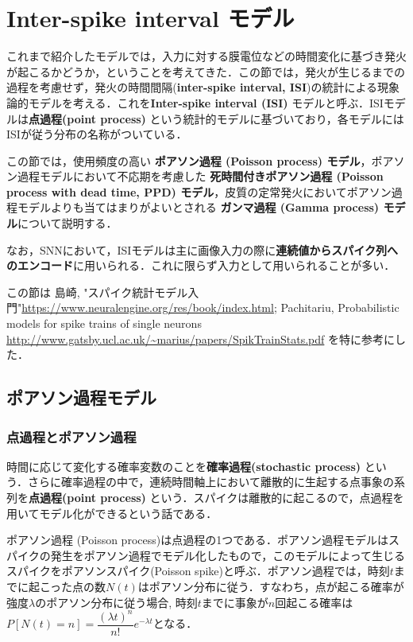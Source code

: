 \section{Inter-spike interval モデル}
これまで紹介したモデルでは，入力に対する膜電位などの時間変化に基づき発火が起こるかどうか，ということを考えてきた．この節では，発火が生じるまでの過程を考慮せず，発火の時間間隔(\textbf{inter-spike interval, ISI})の統計による現象論的モデルを考える．これを\textbf{Inter-spike interval (ISI)} モデルと呼ぶ．ISIモデルは\textbf{点過程(point process)} という統計的モデルに基づいており，各モデルにはISIが従う分布の名称がついている．

この節では，使用頻度の高い \textbf{ポアソン過程 (Poisson process) モデル}，ポアソン過程モデルにおいて不応期を考慮した \textbf{死時間付きポアソン過程 (Poisson process with dead time, PPD) モデル}，皮質の定常発火においてポアソン過程モデルよりも当てはまりがよいとされる \textbf{ガンマ過程 (Gamma process) モデル}について説明する．

なお，SNNにおいて，ISIモデルは主に画像入力の際に\textbf{連続値からスパイク列へのエンコード}に用いられる．これに限らず入力として用いられることが多い．


この節は 島崎, "スパイク統計モデル入門"\url{https://www.neuralengine.org/res/book/index.html}; Pachitariu, Probabilistic models for spike trains of single neurons \url{http://www.gatsby.ucl.ac.uk/~marius/papers/SpikTrainStats.pdf} を特に参考にした．
\subsection{ポアソン過程モデル}
\subsubsection{点過程とポアソン過程}
時間に応じて変化する確率変数のことを\textbf{確率過程(stochastic process)} という．さらに確率過程の中で，連続時間軸上において離散的に生起する点事象の系列を\textbf{点過程(point process)} という．スパイクは離散的に起こるので，点過程を用いてモデル化ができるという話である．

ポアソン過程 (Poisson process)は点過程の1つである．ポアソン過程モデルはスパイクの発生をポアソン過程でモデル化したもので，このモデルによって生じるスパイクをポアソンスパイク(Poisson spike)と呼ぶ．ポアソン過程では，時刻$t$までに起こった点の数$N(t)$はポアソン分布に従う．すなわち，点が起こる確率が強度$\lambda$のポアソン分布に従う場合, 時刻$t$までに事象が$n$回起こる確率は$P[N(t)=n]=\dfrac{(\lambda t)^{n}}{n !} e^{-\lambda t}$となる． 

